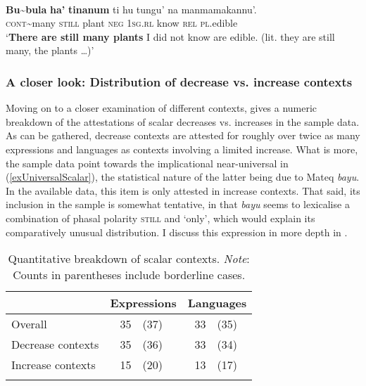 \begin{exe}
	\ex {}\label{exScalarStructuralChamorro}\\
\gll \textbf{Bu}\sim{}\textbf{bula} \textbf{ha'} \textbf{tinanum} ti hu tungu' na manmamakannu'.\\
	\textsc{cont}\sim{}many \textsc{still} plant \textsc{neg} 1\textsc{sg}.\textsc{rl} know \textsc{rel} \textsc{pl}.edible\\
	\glt \lq \textbf{There are still many plants} I did not know are edible. (lit. they are still many, the plants …)'
	\parencite[325]{Chung2020}
\end{exe}

\subsubsection{A closer look: Distribution of decrease vs. increase contexts}
Moving on to a closer examination of different contexts,  gives a numeric breakdown of the attestations of scalar decreases vs. increases in the sample data. As can be gathered, decrease contexts are attested for roughly over twice as many expressions and languages as contexts involving a limited increase. What is more, the sample data point towards the implicational near-universal in (\ref{exUniversalScalar}), the statistical nature of the latter being due to Mateq \textit{bayu}. In the available data, this item is only attested in increase contexts. That said, its inclusion in the sample is somewhat tentative, in that \textit{bayu} seems to lexicalise a combination of phasal polarity \textsc{still} and  \lq only\rq{}, which would explain its comparatively unusual distribution. I discuss this expression in more depth in .

\begin{table}
	\caption{Quantitative breakdown of scalar contexts. \emph{Note}: Counts in parentheses include borderline cases.\label{tableScalarQuant}}
	\begin{tabular}{l rl rl}
			\lsptoprule
			& \multicolumn{2}{c}{Expressions} & \multicolumn{2}{c}{Languages}\\
			\midrule
			Overall & 35 & (37) & 33 & (35)\\
			\midrule
			Decrease contexts & 35 & (36) & 33 & (34)\\ 
			Increase contexts & 15 & (20) & 13 & (17)\\	
			\lspbottomrule
		\end{tabular}
\end{table}



